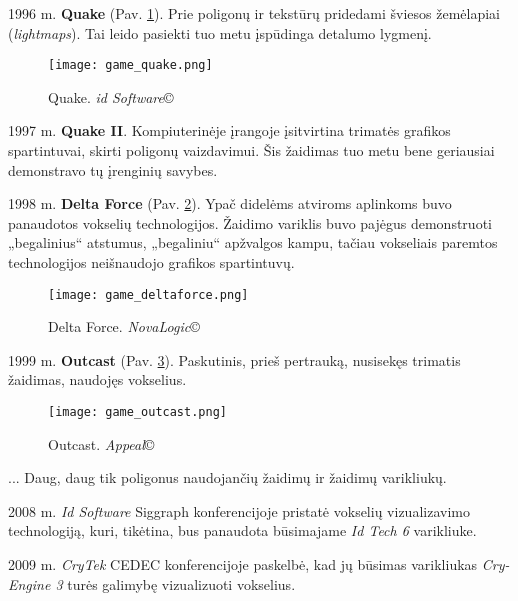 \begin{list}
\item[1996 m.] {\bf Quake} (Pav. \ref{fig:game_quake}). Prie poligonų ir
tekstūrų pridedami šviesos žemėlapiai (\emph{lightmaps}). Tai leido pasiekti
tuo metu įspūdinga detalumo lygmenį.

\begin{figure}[!ht]
\centering
\texttt{[image: game\_quake.png]}
\caption{Quake. \emph{id Software}\copyright}
\label{fig:game_quake}
\end{figure}

\item[1997 m.] {\bf Quake II}. Kompiuterinėje įrangoje įsitvirtina trimatės
grafikos spartintuvai, skirti poligonų vaizdavimui. Šis žaidimas tuo metu bene
geriausiai demonstravo tų įrenginių savybes.

\item[1998 m.] {\bf Delta Force} (Pav. \ref{fig:game_deltaforce}). Ypač
didelėms atviroms aplinkoms buvo panaudotos vokselių technologijos. Žaidimo
variklis buvo pajėgus demonstruoti „begalinius“ atstumus, „begaliniu“
apžvalgos kampu, tačiau vokseliais paremtos technologijos neišnaudojo grafikos
spartintuvų.

\begin{figure}[!ht]
\centering
\texttt{[image: game\_deltaforce.png]}
\caption{Delta Force. \emph{NovaLogic}\copyright}
\label{fig:game_deltaforce}
\end{figure}

\item[1999 m.] {\bf Outcast} (Pav. \ref{fig:game_outcast}). Paskutinis, prieš
pertrauką, nusisekęs trimatis žaidimas, naudojęs vokselius.

\begin{figure}[!ht]
\centering
\texttt{[image: game\_outcast.png]}
\caption{Outcast. \emph{Appeal}\copyright}
\label{fig:game_outcast}
\end{figure}

\item[...] Daug, daug tik poligonus naudojančių žaidimų ir žaidimų varikliukų.

\item[2008 m.] \emph{Id Software} Siggraph konferencijoje pristatė vokselių
vizualizavimo technologiją, kuri, tikėtina, bus panaudota būsimajame \emph{Id
Tech 6} varikliuke.

\item[2009 m.] \emph{CryTek} CEDEC konferencijoje paskelbė, kad jų būsimas
varikliukas \emph{Cry-Engine 3} turės galimybę vizualizuoti vokselius.


\end{list}


